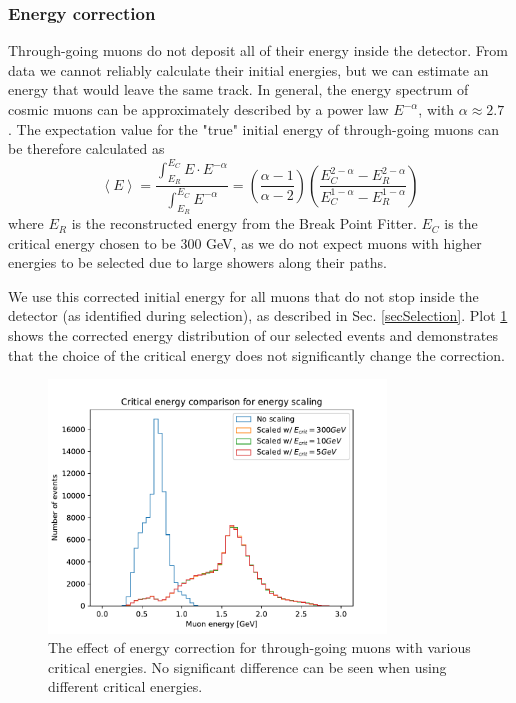 \subsubsection*{Energy correction}
Through-going muons do not deposit all of their energy inside the detector. From data we cannot reliably calculate their initial energies, but we can estimate an energy that would leave the same track. In general, the energy spectrum of cosmic muons can be approximately described by a power law $E^{-\alpha}$, with $\alpha\approx2.7$ \cite{NOVA-doc-51327-v3,rpp2022-rev-cosmic-rays.pdf}. The expectation value for the "true" initial energy of through-going muons can be therefore calculated as
\begin{equation}
\left\langle E\right\rangle =\frac{\int^{E_C}_{E_R} E\cdot E^{-\alpha}}{\int^{E_C}_{E_R} E^{-\alpha}}=\left(\frac{\alpha -1}{\alpha -2}\right)\left(\frac{E_C^{2-\alpha}-E_R^{2-\alpha}}{E_C^{1-\alpha}-E_R^{1-\alpha}}\right)
\end{equation}
where $E_R$ is the reconstructed energy from the Break Point Fitter. $E_C$ is the critical energy chosen to be 300 GeV, as we do not expect muons with higher energies to be selected due to large showers along their paths.

We use this corrected initial energy for all muons that do not stop inside the detector (as identified during selection), as described in Sec. \ref{secSelection}. Plot \ref{figEnergyScaling} shows the corrected energy distribution of our selected events and demonstrates that the choice of the critical energy does not significantly change the correction. 

\begin{figure}[hbtp]
\centering
\includegraphics[width=0.8\textwidth]{Plots/DataBasedSimulation/ECritComparison.pdf}
\caption{The effect of energy correction for through-going muons with various critical energies. No significant difference can be seen when using different critical energies.}
\label{figEnergyScaling}
\end{figure}

